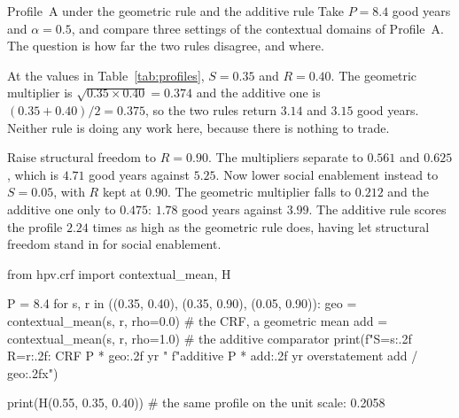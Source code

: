 \begin{workedexample}{Profile~A under the geometric rule and the additive rule}
Take $P=8.4$ good years and $\alpha=0.5$, and compare three settings of the
contextual domains of Profile~A. The question is how far the two rules
disagree, and where.

At the values in Table~\ref{tab:profiles}, $S=0.35$ and $R=0.40$. The geometric multiplier is
$\sqrt{0.35\times0.40}=0.374$ and the additive one is $(0.35+0.40)/2=0.375$, so
the two rules return $3.14$ and $3.15$ good years. Neither rule is doing any
work here, because there is nothing to trade.

Raise structural freedom to $R=0.90$. The multipliers separate to $0.561$
and $0.625$, which is $4.71$ good years against $5.25$. Now lower social
enablement instead to $S=0.05$, with $R$ kept at $0.90$. The geometric
multiplier falls to $0.212$ and the additive one only to $0.475$: $1.78$ good
years against $3.99$. The additive rule scores the profile $2.24$ times as high
as the geometric rule does, having let structural freedom stand in for social
enablement.

\begin{wecode}[Python]
from hpv.crf import contextual_mean, H

P = 8.4
for s, r in ((0.35, 0.40), (0.35, 0.90), (0.05, 0.90)):
    geo = contextual_mean(s, r, rho=0.0)   # the CRF, a geometric mean
    add = contextual_mean(s, r, rho=1.0)   # the additive comparator
    print(f"S={s:.2f} R={r:.2f}: CRF {P * geo:.2f} yr   "
          f"additive {P * add:.2f} yr   overstatement {add / geo:.2f}x")

print(H(0.55, 0.35, 0.40))   # the same profile on the unit scale: 0.2058
\end{wecode}

\end{workedexample}

